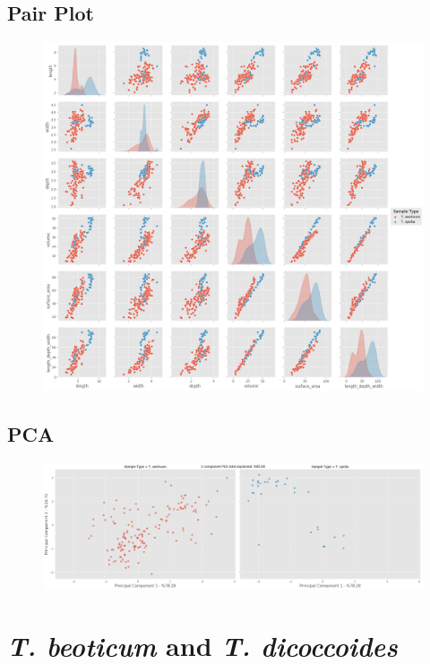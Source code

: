 \documentclass[11pt]{report}
\begin{document}
\subsection{Pair Plot}
\label{sec:org789343d}

\begin{figure}[htbp]
\centering
\includegraphics[width=18cm]{./images/results/group3/pairplot.png}
\label{fig:orgd807d6e}
\end{figure}

\clearpage
\subsection{PCA}
\label{sec:org7eb3cd2}
\begin{figure}[htbp]
\centering
\includegraphics[width=18cm]{./images/results/group3/pca.png}
\label{fig:org935117f}
\end{figure}


\clearpage
\section{\emph{T. beoticum} and \emph{T. dicoccoides}}
\label{sec:orge23f08a}
\end{document}
